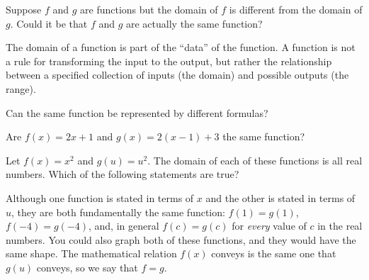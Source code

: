 \documentclass{ximera}
\begin{document}
\begin{problem}
  Suppose $f$ and $g$ are functions but the domain of $f$ is different
  from the domain of $g$.  Could it be that $f$ and $g$ are actually
  the same function?

  \begin{multipleChoice}
  \end{multipleChoice}

  \begin{feedback}
    The domain of a function is part of the ``data'' of the function.
    A function is not a rule for transforming the input to the output,
    but rather the relationship between a specified collection of
    inputs (the domain) and possible outputs (the range).
  \end{feedback}
\end{problem}


\begin{problem}
  Can the same function be represented by different formulas?

  \begin{multipleChoice}
  \end{multipleChoice}

  \begin{problem}
    Are $f(x) = 2x+1$ and $g(x) = 2(x-1)+3$ the same function?

    \begin{multipleChoice}
    \end{multipleChoice}
  \end{problem}
\end{problem} 

\begin{problem}
	Let $f(x) =x^2$ and $g(u) = u^2$.  The domain of each of these functions is all real numbers.  Which of the following statements are true?
	\begin{multipleChoice}
	\end{multipleChoice}
    
    \begin{feedback}[correct]
    Although one function is stated in terms of $x$ and the other is stated in terms of $u$, they are both fundamentally the same function: $f(1) = g(1)$, $f(-4) = g(-4)$, and, in general $f(c) = g(c)$ for \textit{every} value of $c$ in the real numbers.  You could also graph both of these functions, and they would have the same shape.  The mathematical relation $f(x)$ conveys is the same one that $g(u)$ conveys, so we say that $f = g$.  
    \end{feedback}
\end{problem}



%
\end{document}
